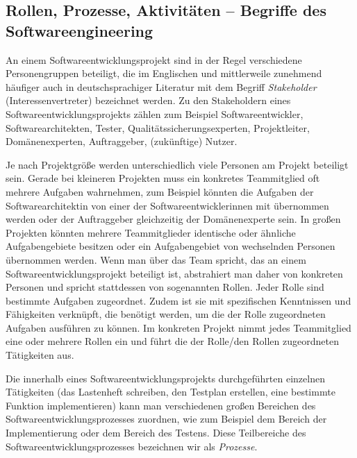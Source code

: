 \subsection[Rollen, Prozesse, Aktivitäten – Begriffe des Software-\\engineering]{Rollen, Prozesse, Aktivitäten – Begriffe des Softwareengineering}
\label{sec:Kap-1.2.2}

An einem Softwareentwicklungsprojekt sind in der Regel verschiedene Personengruppen beteiligt, die im Englischen und mittlerweile zunehmend häufiger auch in deutschsprachiger Literatur mit dem Begriff \textit{Stakeholder}  
(Interessenvertreter) bezeichnet werden. Zu den Stakeholdern eines Softwareentwicklungsprojekts zählen zum Beispiel Softwareentwickler, Softwarearchitekten, Tester, Qualitätssicherungsexperten, Projektleiter, Domänenexperten, Auftraggeber, (zukünftige) Nutzer. 

Je nach Projektgröße werden unterschiedlich viele Personen am Projekt beteiligt sein. Gerade bei kleineren Projekten muss ein konkretes Teammitglied oft mehrere Aufgaben wahrnehmen, zum Beispiel könnten die Aufgaben der Soft\-ware\-archi\-tektin 
von einer der Softwareentwicklerinnen mit übernommen werden oder der Auftraggeber gleichzeitig der Domänenexperte 
sein. In großen Projekten könnten mehrere Teammitglieder identische oder ähnliche Aufgabengebiete besitzen oder ein Aufgabengebiet von wechselnden Personen übernommen werden. Wenn man über das Team spricht, das an einem Softwareentwicklungsprojekt beteiligt ist, abstrahiert man daher von konkreten Personen und spricht stattdessen von sogenannten Rollen. Jeder Rolle sind bestimmte Aufgaben zugeordnet. Zudem ist sie mit spezifischen Kenntnissen und Fähigkeiten verknüpft, die benötigt werden, um die der Rolle zugeordneten Aufgaben ausführen zu können. Im konkreten Projekt nimmt jedes Teammitglied eine oder mehrere Rollen ein und führt die der Rolle/den Rollen zugeordneten Tätigkeiten aus.


Die innerhalb eines Softwareentwicklungsprojekts durchgeführten einzelnen Tätigkeiten (\zb das Lastenheft schreiben, den Testplan erstellen, eine bestimmte Funk\-tion implementieren) kann man verschiedenen großen Bereichen des Soft\-ware\-entwick\-lungs\-prozesses zuordnen, wie zum Beispiel dem Bereich der Implementierung oder dem Bereich des Testens. Diese Teilbereiche des Softwareentwicklungsprozesses bezeichnen wir als \textit{Prozesse}. 


